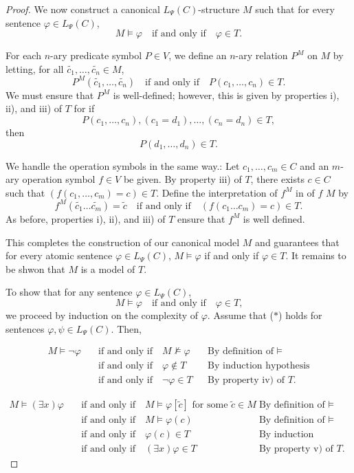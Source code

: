 \documentclass{scrartcl}
\renewcommand{\phi}{\varphi}
\begin{document}
\begin{proof}
We now construct a canonical $L_\Psi(C)$-structure $M$ such that for every sentence $\phi\in L_\Psi(C)$, 
\[
M \models \phi \quad \text{if and only if} \quad \phi\in T\text{.}
\]


For each $n$-ary predicate symbol $P\in V$, we define an $n$-ary relation $P^M$ on $M$ by letting, for all $\tilde{c_1},\dots, \tilde{c_n} \in M$, 
\[
P^M(\tilde{c_1}, \dots,  \tilde{c_n})\quad \text{if and only if}\quad P(c_1, \dots,  c_n)\in T\text{.}
\]
We must ensure that $P^M$ is well-defined; however, this is given by properties i), ii), and iii) of $T$ for  if
\[
P(c_1, \dots,  c_n), (c_1 = d_1),  \dots, (c_n = d_n) \in T,
\]
then
\[
P(d_1, \dots,  d_n) \in T \text{.}
\]


We handle the operation symbols in the same way.: Let $c_1,\dots, c_m\in C$ and an $m$-ary operation symbol $f\in V$ be given. By property iii) of $T$, there exists $c\in C $ such that $(f(c_1, \dots,  c_m) = c)\in T$. Define the interpretation of $f^M$ in of $f$ $M$ by 
\[
f^M (\tilde{c_1}\dots \tilde{c_m})=\tilde{c} \quad \text{if and only if} \quad (f(c_1\dots c_m)=c)\in T\text{.}
\]
As before, properties i), ii), and iii) of $T$ ensure that $f^M$ is well defined.

This completes the construction of our canonical model $M$ and guarantees that for every atomic sentence $\phi\in L_\Psi(C)$, $M \models\phi$ if and only if $\phi\in T$. It remains to be shwon that $M$ is a model of $T$.

To show that for any sentence $\phi\in L_\Psi(C)$,
\[
M \models \phi \quad \text{if and only if} \quad \phi\in T\text{,} \tag{$*$}
\]
we proceed by induction on the complexity of $\phi$. Assume that ($*$) holds for sentences $\phi,\psi\in L_\Psi(C)$. Then,

\begin{align*}
M \models \neg\phi \quad & \text{if and only if} \quad M \not \models \phi &&\text{By definition of $\models$}\\
&\text{if and only if} \quad \phi \not \in T &&\text{By induction hypothesis}\\
&\text{if and only if} \quad  \neg\phi\in T &&\text{By property iv) of $T$}.
\end{align*}


\begin{align*}
M \models (\exists x)\phi \quad & \text{if and only if} \quad M \models \phi[\tilde{c}] \text{ for some } \tilde{c}\in M   &&\text{By definition of $\models$}\\
&\text{if and only if} \quad M\models \phi(c) &&\text{By definition of $\models$}\\
&\text{if and only if} \quad \phi(c) \in T &&\text{By induction hypothesis}\\
&\text{if and only if} \quad  (\exists x)\phi \in T &&\text{By property v) of $T$}.
\end{align*}


\end{proof}
\end{document}
